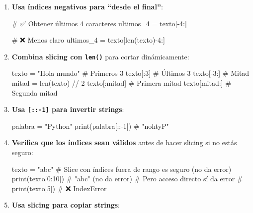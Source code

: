 \documentclass[
  doc,
  floatsintext,
  longtable,
  a4paper,
  nolmodern,
  notxfonts,
  notimes,
  12pt,
  colorlinks=true,linkcolor=blue,citecolor=blue,urlcolor=blue]{apa7}
\newenvironment{Shaded}{\begin{snugshade}}{\end{snugshade}}
\newcommand{\BuiltInTok}[1]{\textcolor[rgb]{0.00,0.23,0.31}{#1}}
\newcommand{\CommentTok}[1]{\textcolor[rgb]{0.37,0.37,0.37}{#1}}
\newcommand{\DecValTok}[1]{\textcolor[rgb]{0.68,0.00,0.00}{#1}}
\newcommand{\NormalTok}[1]{\textcolor[rgb]{0.00,0.23,0.31}{#1}}
\newcommand{\OperatorTok}[1]{\textcolor[rgb]{0.37,0.37,0.37}{#1}}
\newcommand{\StringTok}[1]{\textcolor[rgb]{0.13,0.47,0.30}{#1}}
\begin{document}
\begin{enumerate}
\def\labelenumi{\arabic{enumi}.}
\item
  \textbf{Usa índices negativos para ``desde el final''}:

\begin{Shaded}
\begin{Highlighting}[]
\CommentTok{\# ✅ Obtener últimos 4 caracteres}
\NormalTok{ultimos\_4 }\OperatorTok{=}\NormalTok{ texto[}\OperatorTok{{-}}\DecValTok{4}\NormalTok{:]}

\CommentTok{\# ❌ Menos claro}
\NormalTok{ultimos\_4 }\OperatorTok{=}\NormalTok{ texto[}\BuiltInTok{len}\NormalTok{(texto)}\OperatorTok{{-}}\DecValTok{4}\NormalTok{:]}
\end{Highlighting}
\end{Shaded}
\item
  \textbf{Combina slicing con \texttt{len()}} para cortar dinámicamente:

\begin{Shaded}
\begin{Highlighting}[]
\NormalTok{texto }\OperatorTok{=} \StringTok{"Hola mundo"}
\CommentTok{\# Primeros 3}
\NormalTok{texto[:}\DecValTok{3}\NormalTok{]}
\CommentTok{\# Últimos 3}
\NormalTok{texto[}\OperatorTok{{-}}\DecValTok{3}\NormalTok{:]}
\CommentTok{\# Mitad}
\NormalTok{mitad }\OperatorTok{=} \BuiltInTok{len}\NormalTok{(texto) }\OperatorTok{//} \DecValTok{2}
\NormalTok{texto[:mitad]  }\CommentTok{\# Primera mitad}
\NormalTok{texto[mitad:]  }\CommentTok{\# Segunda mitad}
\end{Highlighting}
\end{Shaded}
\item
  \textbf{Usa \texttt{{[}::-1{]}} para invertir strings}:

\begin{Shaded}
\begin{Highlighting}[]
\NormalTok{palabra }\OperatorTok{=} \StringTok{"Python"}
\BuiltInTok{print}\NormalTok{(palabra[::}\OperatorTok{{-}}\DecValTok{1}\NormalTok{])  }\CommentTok{\# "nohtyP"}
\end{Highlighting}
\end{Shaded}
\item
  \textbf{Verifica que los índices sean válidos} antes de hacer slicing
  si no estás seguro:

\begin{Shaded}
\begin{Highlighting}[]
\NormalTok{texto }\OperatorTok{=} \StringTok{"abc"}
\CommentTok{\# Slice con índices fuera de rango es seguro (no da error)}
\BuiltInTok{print}\NormalTok{(texto[}\DecValTok{0}\NormalTok{:}\DecValTok{10}\NormalTok{])  }\CommentTok{\# "abc" (no da error)}
\CommentTok{\# Pero acceso directo sí da error}
\CommentTok{\# print(texto[5])  \# ❌ IndexError}
\end{Highlighting}
\end{Shaded}
\item
  \textbf{Usa slicing para copiar strings}:


\end{enumerate}
\end{document}
